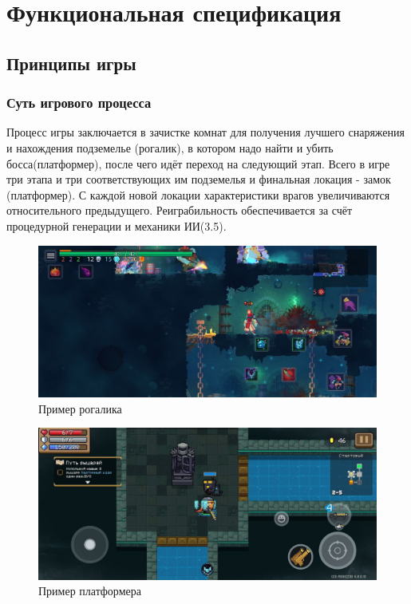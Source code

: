 \documentclass{article}
\begin{document}
\section{Функциональная спецификация}
\subsection{Принципы игры}
\subsubsection{Суть игрового процесса}
Процесс игры заключается в зачистке комнат для получения лучшего снаряжения и нахождения подземелье (рогалик), в котором надо найти и убить босса(платформер), после чего идёт переход на следующий этап. Всего в игре три этапа и три соответствующих им подземелья и финальная локация - замок (платформер). С каждой новой локации характеристики врагов увеличиваются относительного предыдущего. Реиграбильность обеспечивается за счёт процедурной генерации и механики ИИ(3.5).
\begin{figure}[h]
    \centering
    \includegraphics[width=1\textwidth]{primerP}
    \caption{Пример рогалика}
\end{figure}
\begin{figure}[h]
    \centering
    \includegraphics[width=1\textwidth]{primerR}
    \caption{Пример платформера}
\end{figure}
\end{document}
